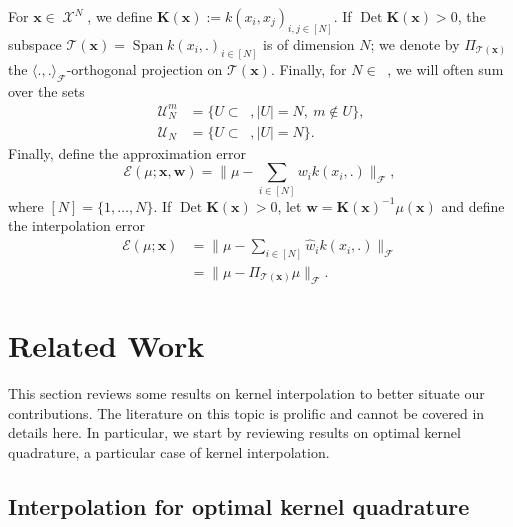 \documentclass[twoside,11pt]{book}
\numberwithin{theorem}{chapter}
\numberwithin{definition}{chapter}
\numberwithin{proposition}{chapter}
\numberwithin{corollary}{chapter}
\numberwithin{example}{chapter}
\numberwithin{lemma}{chapter}
\numberwithin{assumption}{chapter}
\DeclareMathOperator{\Det}{Det}
\DeclareMathOperator{\Span}{\mathrm{Span}}
\DeclareMathOperator{\F}{\mathcal{F}}
\DeclareMathOperator{\X}{\mathcal{X}}
\DeclareMathOperator{\Ns}{\mathbb{N}^{*}}
\def\UN{\:\mathcal{U}_N}
\def\UNm{\:\mathcal{U}_N^m}
\newcommand{\rb}[1]{\textcolor{magenta}{#1}}
\begin{document}
For $\bm{x} \in \X^{N}$, we define $\bm{K}(\bm{x}) := k(x_{i},x_{j})_{i,j \in [N]}$. If $\Det \bm{K}(\bm{x})>0$,  the subspace $\mathcal{T}(\bm{x}) = \Span k(x_{i},.)_{i \in [N]}$ is of dimension $N$; we denote by $\Pi_{\mathcal{T}(\bm{x})}$ the $\langle.,. \rangle_{\F}$-orthogonal projection on $\mathcal{T}(\bm{x})$.
Finally, for $N \in \Ns$, we will often sum over the sets
\begin{align}
	\UNm &=  \{ U \subset \Ns, |U| = N,\: m \notin U \},\\
  \UN &=  \{ U \subset \Ns, |U| = N \}.
\end{align}
Finally, define the approximation error
\begin{equation}\label{CVS_def:E}
	\mathcal{E}(\mu;\bm{x},\bm{w}) = \|\mu - \sum\limits_{i \in [N]} w_{i} k(x_{i},.)\|_{\F},
\end{equation}
where $[N]=\{1,\dots,N\}$. If $\Det \bm{K}(\bm{x}) >0$, let $\hat{\bm{w}} = \bm{K}(\bm{x})^{-1} \mu(\bm{x})$ and define the interpolation error
\begin{align}\label{CVS_def:Ei}
	\mathcal{E}(\mu;\bm{x}) &= \|\mu - \sum\limits_{i \in [N]} \hat{w} _{i} k(x_{i},.)\|_{\F}\\
  & = \|\mu - \Pi_{\mathcal{T}(\bm{x})} \mu\|_{\F}.
\end{align}


\section{Related Work}\label{CVS_s:relatedWork}
This section reviews some results on kernel interpolation to better situate our contributions. The literature on this topic is prolific and cannot be covered in details here. In particular, we start by reviewing results on optimal kernel quadrature, a particular case of kernel interpolation.

\subsection{Interpolation for optimal kernel quadrature}\label{CVS_sec:review_optimal_kernel_quadrature}
\end{document}
